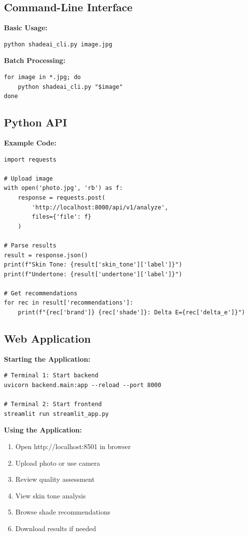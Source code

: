 \subsection{Command-Line Interface}

\textbf{Basic Usage:}
\begin{verbatim}
python shadeai_cli.py image.jpg
\end{verbatim}

\textbf{Batch Processing:}
\begin{verbatim}
for image in *.jpg; do
    python shadeai_cli.py "$image"
done
\end{verbatim}

\subsection{Python API}

\textbf{Example Code:}
\begin{verbatim}
import requests

# Upload image
with open('photo.jpg', 'rb') as f:
    response = requests.post(
        'http://localhost:8000/api/v1/analyze',
        files={'file': f}
    )

# Parse results
result = response.json()
print(f"Skin Tone: {result['skin_tone']['label']}")
print(f"Undertone: {result['undertone']['label']}")

# Get recommendations
for rec in result['recommendations']:
    print(f"{rec['brand']} {rec['shade']}: Delta E={rec['delta_e']}")
\end{verbatim}

\subsection{Web Application}

\textbf{Starting the Application:}
\begin{verbatim}
# Terminal 1: Start backend
uvicorn backend.main:app --reload --port 8000

# Terminal 2: Start frontend
streamlit run streamlit_app.py
\end{verbatim}

\textbf{Using the Application:}
\begin{enumerate}
    \item Open http://localhost:8501 in browser
    \item Upload photo or use camera
    \item Review quality assessment
    \item View skin tone analysis
    \item Browse shade recommendations
    \item Download results if needed
\end{enumerate}

